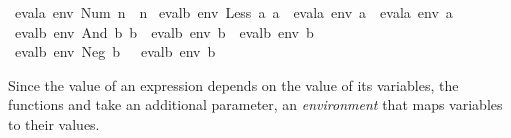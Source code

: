 \begin{isabellebody}
{}\ {}evala\ env\ {}Num\ n{}\ {}\ n{}\isanewline
{}\ {}evalb\ env\ {}Less\ a{}\ a{}{}\ {}\ {}evala\ env\ a{}\ {}\ evala\ env\ a{}{}{}\isanewline
{}\ {}evalb\ env\ {}And\ b{}\ b{}{}\ {}\ {}evalb\ env\ b{}\ {}\ evalb\ env\ b{}{}{}\isanewline
{}\ {}evalb\ env\ {}Neg\ b{}\ {}\ {}{}\ evalb\ env\ b{}{}%
\begin{isamarkuptext}%
Since the value of an expression depends on the value of its
  variables, the functions  and  take an
  additional parameter, an \emph{environment} that maps variables to
  their values.


\end{isamarkuptext}
\end{isabellebody}
